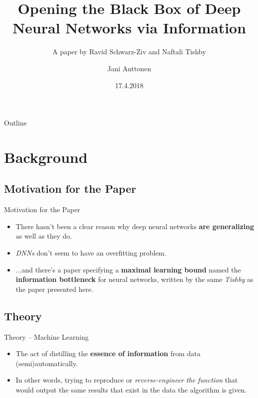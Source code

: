 \documentclass{beamer}
\title{Opening the Black Box of Deep Neural Networks via Information}
\subtitle{A paper by Ravid Schwarz-Ziv and Naftali Tishby}
\author{Jani Anttonen}
\institute[] %
{
  Department of Future Technologies\\
  University of Turku
}
\date{17.4.2018}
\begin{document}
\begin{frame}
  \titlepage
\end{frame}

\begin{frame}{Outline}
  \tableofcontents
\end{frame}

\section{Background}

\subsection{Motivation for the Paper}

\begin{frame}{Motivation for the Paper}
  \begin{itemize}
  \item {
    There hasn't been a clear reason why deep neural networks \textbf{are generalizing} as well as they do.
  }
  \item {
    \textit{DNNs} don't seem to have an overfitting problem.
  }
  \pause
  \item {
    ...and there's a paper specifying a \textbf{maximal learning bound} named the \textbf{information bottleneck} for neural networks, written by the same \textit{Tishby} as the paper presented here.
  }
  \end{itemize}
\end{frame}

\subsection{Theory}

\begin{frame}{Theory -- Machine Learning}
  \begin{itemize}
  \item {
    The act of distilling the \textbf{essence of information} from data (semi)automatically.
  }
  \pause
  \item {
    In other words, trying to reproduce or \textit{reverse-engineer the function} that would output the same results that exist in the data the algorithm is given.
  }
  \end{itemize}
\end{frame}
\end{document}
